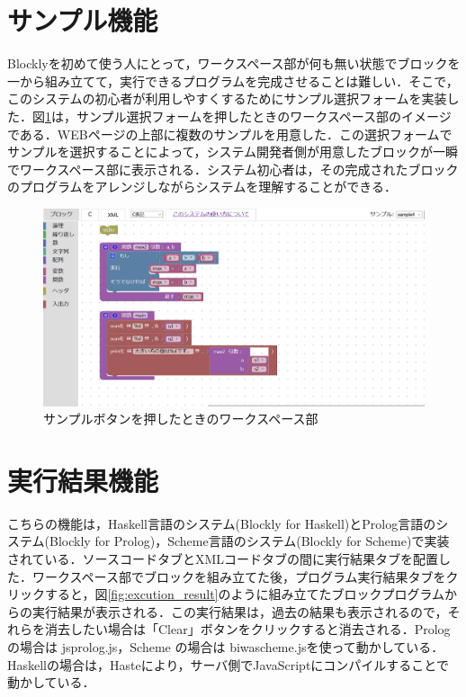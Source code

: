 \documentclass{risepaper}
\begin{document}
   \section{サンプル機能}
Blocklyを初めて使う人にとって，ワークスペース部が何も無い状態でブロックを一から組み立てて，実行できるプログラムを完成させることは難しい．そこで，このシステムの初心者が利用しやすくするためにサンプル選択フォームを実装した．図\ref{fig:sample}は，サンプル選択フォームを押したときのワークスペース部のイメージである．WEBページの上部に複数のサンプルを用意した．この選択フォームでサンプルを選択することによって，システム開発者側が用意したブロックが一瞬でワークスペース部に表示される．システム初心者は，その完成されたブロックのプログラムをアレンジしながらシステムを理解することができる．

\begin{figure}[h]
\begin{center}
\includegraphics[scale=0.5]{img/sample.PNG}
\caption{サンプルボタンを押したときのワークスペース部}%
\label{fig:sample}
\end{center}%
\end{figure}%

   \section{実行結果機能}
   
こちらの機能は，Haskell言語のシステム(Blockly for Haskell)とProlog言語のシステム(Blockly for Prolog)，Scheme言語のシステム(Blockly for Scheme)で実装されている．ソースコードタブとXMLコードタブの間に実行結果タブを配置した．ワークスペース部でブロックを組み立てた後，プログラム実行結果タブをクリックすると，図\ref{fig:excution_result}のように組み立てたブロックプログラムからの実行結果が表示される．この実行結果は，過去の結果も表示されるので，それらを消去したい場合は「Clear」ボタンをクリックすると消去される．Prolog の場合は jsprolog.js\cite{jsprolog}，Scheme の場合は biwascheme.js\cite{biwascheme, biwascheme2}を使って動かしている．Haskellの場合は，Haste\cite{haste}により，サーバ側でJavaScriptにコンパイルすることで動かしている．
\end{document}
